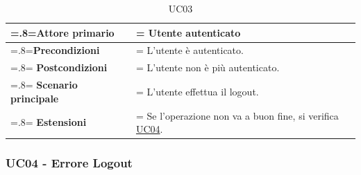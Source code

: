             \begin{table}[H]
                \centering
                \renewcommand{\arraystretch}{1.8}
                \renewcommand\tabularxcolumn[1]{m{#1}}
                \begin{tabularx}{0.9\textwidth} {
                    >{\hsize=.8\hsize\linewidth=\hsize}X
                    >{\hsize=1.2\hsize\linewidth=\hsize}X}
                    \hline
                    \textbf{Attore primario} & Utente autenticato \\
                    \hline
                    \textbf{Precondizioni} & L'utente è autenticato. \\
                    \hline
                    \textbf{Postcondizioni} & L'utente non è più autenticato. \\
                    \hline
                    \textbf{Scenario principale} & L'utente effettua il logout. \\
                    \hline
                    \textbf{Estensioni} & Se l'operazione non va a buon fine, si verifica \hyperref[UC04]{UC04}. \\
                \end{tabularx}
                \caption{UC03}
            \end{table}

            \subsubsection{UC04 - Errore Logout}
            \label{UC04}
    
